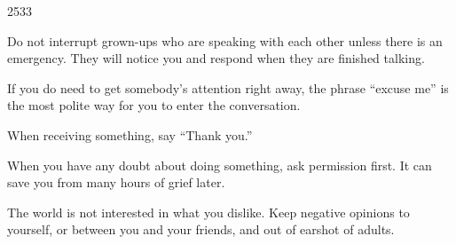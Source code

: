 \documentclass[12pt]{article}
\makeatletter
\newcommand\HUGE{\@setfontsize\Huge{25}{33}}
\newcommand{\baseheight}{-0.1ex}
\newcommand{\lowercaseheight}{1ex}
\newcommand{\uppercaseheight}{2ex}
\newcommand{\descenderdepth}{-0.6ex}
\newenvironment{drillsheet}{
    \setlength\linenumbersep{0pt}
    \renewcommand{\thelinenumber}{
        \begin{tikzpicture}[overlay]
                \draw [line width=0.25mm] ((0.85ex,\baseheight) -- ++(\textwidth,0);
                \draw [line width=0.03mm,dashed] ((0.85ex,\lowercaseheight) -- ++(\textwidth,0);
                \draw [line width=0.03mm] (0.85ex,\uppercaseheight) -- ++(\textwidth,0);
                \draw [line width=0.25mm] (0.85ex,{-2.0 * \uppercaseheight + \baseheight}) --                 ++(\textwidth,0);
                \draw [line width=0.03mm,dashed] (0.85ex,{-2.0 * \uppercaseheight + \lowercaseheight}) --                 ++(\textwidth,0);
                \draw [line width=0.03mm] (0.85ex,{-2.0 * \uppercaseheight + \uppercaseheight}) --                 ++(\textwidth,0);
        \end{tikzpicture}
    }
    \renewcommand\linenumberfont{\normalfont\color{black}}
    \begin{linenumbers}
        \color{black}
}{
    \end{linenumbers}
}
\makeatother
\begin{document}
\HUGE
\begin{drillsheet}
\begin{flushleft}
Do not interrupt grown-ups who are speaking with each other unless there is an emergency. They will notice you and respond when they are finished talking.

If you do need to get somebody’s attention right away, the phrase “excuse me” is the most polite way for you to enter the conversation.

When receiving something, say “Thank you.”

When you have any doubt about doing something, ask permission first. It can save you from many hours of grief later.

The world is not interested in what you dislike. Keep negative opinions to yourself, or between you and your friends, and out of earshot of adults.

\clearpage
\end{flushleft}
\end{drillsheet}
\end{document}
